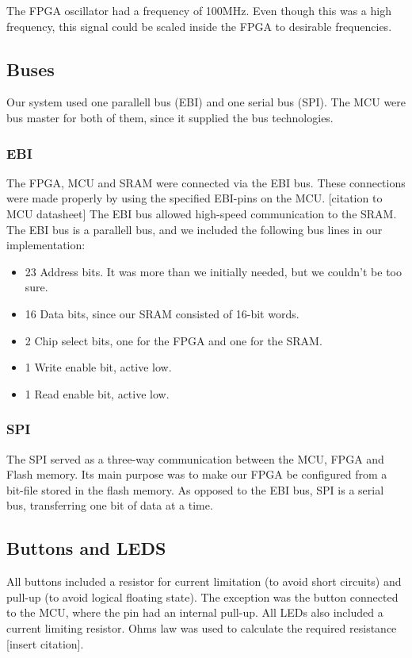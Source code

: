 The FPGA oscillator had a frequency of 100MHz.
Even though this was a high frequency, this signal could be scaled inside the FPGA to desirable frequencies.

\subsection{Buses}
Our system used one parallell bus (EBI) and one serial bus (SPI).
The MCU were bus master for both of them, since it supplied the bus technologies.

\subsubsection{EBI}
The FPGA, MCU and SRAM were connected via the EBI bus.
These connections were made properly by using the specified EBI-pins on the MCU. [citation to MCU datasheet]
The EBI bus allowed high-speed communication to the SRAM.
The EBI bus is a parallell bus, and we included the following bus lines in our implementation:
\begin{itemize}
\item 23 Address bits. It was more than we initially needed, but we couldn't be too sure.
\item 16 Data bits, since our SRAM consisted of 16-bit words.
\item 2 Chip select bits, one for the FPGA and one for the SRAM.
\item 1 Write enable bit, active low.
\item 1 Read enable bit, active low.
\end{itemize}

\subsubsection{SPI}
The SPI served as a three-way communication between the MCU, FPGA and Flash memory.
Its main purpose was to make our FPGA be configured from a bit-file stored in the flash memory.
As opposed to the EBI bus, SPI is a serial bus, transferring one bit of data at a time.

\subsection{Buttons and LEDS}
All buttons included a resistor for current limitation (to avoid short circuits) and pull-up (to avoid logical floating state).
The exception was the button connected to the MCU, where the pin had an internal pull-up.
All LEDs also included a current limiting resistor. 
Ohms law was used to calculate the required resistance [insert citation].

